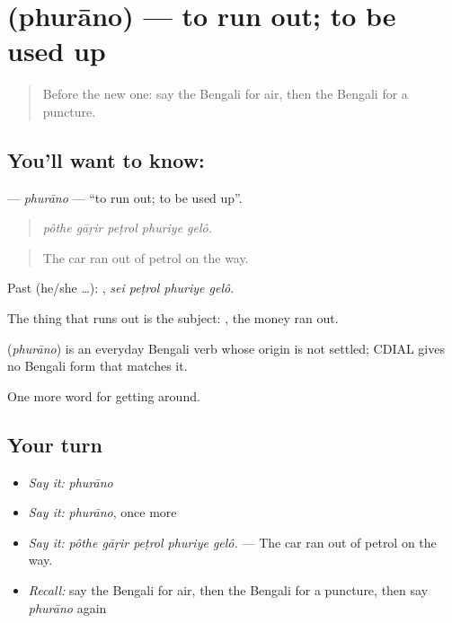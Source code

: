 \section[\texorpdfstring{\bn{ফুরানো} (phurāno)}{ফুরানো (phurāno)}]{ (phurāno) — to run out; to be used up}

\label{lesson:BN-C393-phurano}



\begin{quote}
Before the new one: say the Bengali for air, then the Bengali for a puncture.
\end{quote}

\subsection*{You'll want to know: }
\textbf{} — \emph{phurāno} — \textquotedblleft{}to run out; to be used up\textquotedblright{}.

\begin{quote}
    
\end{quote}

\begin{quote}
\emph{pôthe gāṛir peṭrol phuriye gelô.}
\end{quote}

\begin{quote}
The car ran out of petrol on the way.
\end{quote}

Past (he/she …):    , \emph{sei peṭrol phuriye gelô}.

The thing that runs out is the subject:   , the money ran out.

\begin{cousinweb}
\textbf{} (\emph{phurāno}) is an everyday Bengali verb whose origin is not settled; CDIAL gives no Bengali form that matches it.
\end{cousinweb}

\begin{grammarlens}[title={What you've built}]
One more word for getting around.
\end{grammarlens}

\subsection*{Your turn}
\begin{itemize}
\raggedright
  \item \emph{Say it:} \emph{phurāno}
  \item \emph{Say it:} \emph{phurāno}, once more
  \item \emph{Say it:} \emph{pôthe gāṛir peṭrol phuriye gelô.} — The car ran out of petrol on the way.
  \item \emph{Recall:} say the Bengali for air, then the Bengali for a puncture, then say \emph{phurāno} again
\end{itemize}

